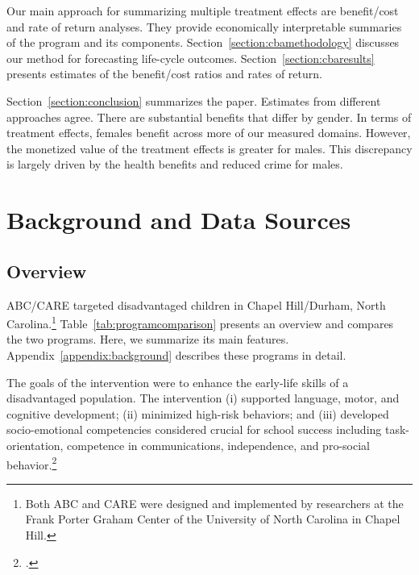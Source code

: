Our main approach for summarizing multiple treatment effects are benefit/cost and rate of return analyses. They provide economically interpretable summaries of the program and its components. Section~\ref{section:cbamethodology} discusses our method for forecasting life-cycle outcomes. Section~\ref{section:cbaresults} presents estimates of the benefit/cost ratios and rates of return.

Section~\ref{section:conclusion} summarizes the paper. Estimates from different approaches agree. There are substantial benefits that differ by gender. In terms of treatment effects, females benefit across more of our measured domains. However, the monetized value of the treatment effects is greater for males. This discrepancy is largely driven by the health benefits and reduced crime for males.

\section[Background and Data Sources]{Background and Data Sources} \label{section:background}

\subsection{Overview}

ABC/CARE targeted disadvantaged children in Chapel Hill/Durham, North Carolina.\footnote{Both ABC and CARE were designed and implemented by researchers at the Frank Porter Graham Center of the University of North Carolina in Chapel Hill.} Table~\ref{tab:programcomparison} presents an overview and compares the two programs. Here, we summarize its main features. Appendix~\ref{appendix:background} describes these programs in detail.

The goals of the intervention were to enhance the early-life skills of a disadvantaged population. The intervention (i) supported language, motor, and cognitive development; (ii) minimized high-risk behaviors; and (iii) developed socio-emotional competencies considered crucial for school success including task-orientation, competence in communications, independence, and pro-social behavior.\footnote{\citet{Ramey_Collier_etal_1976_CarolinaAbecedarianProject, Ramey_etal_1985_Project-CARE_TiECSE, Sparling_1974_Synth_Edu_Infant_SPEECH, Wasik_Ramey_etal_1990_CD, Ramey-etal_2012-ABC}.}

